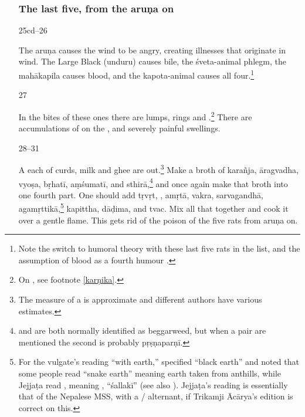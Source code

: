\begin{translation}
\begin{itemize}
\subsubsection{The last five, from the \Gls{aruṇa} on}
\item[25cd--26]

The \Gls{aruṇa} causes the wind to be angry, creating illnesses that
originate in wind. The Large Black (\gls{unduru}) causes bile, the
\Gls{śveta-animal} phlegm, the \Gls{mahākapila} causes blood, and the
\Gls{kapota-animal} causes all four.\footnote{Note the switch to humoral
    theory with these last five rats in the list, and the assumption of blood as a 
    fourth humour .}

\item[27]

In the bites of these ones there are lumps, rings and
.\footnote{On , see footnote
    \ref{karṇika}.}  There are accumulations of  on the 
    , and severely painful swellings.

\item[28--31]    
    
A  each of curds, milk and ghee are
 out.\footnote{The measure of a  is
    approximate and different authors have various estimates.} Make a
    broth of \gls{karañja}, \gls{āragvadha}, \gls{vyoṣa}, \gls{bṛhatī},
    \gls{aṃśumatī}, and \gls{sthirā},\footnote{ and
         are both normally identified as beggarweed, but when a
        pair are mentioned the second is probably \gls{pṛṣṇaparṇī}.} and once
    again make that broth into one fourth part. %
    One should add    \gls{tṛvṛt}, , \gls{amṛtā},
    \gls{vakra}, \gls{sarvagandhā}, \gls{agamṛttikā},\footnote{For the
        vulgate's reading  “with earth,” 
        specified “black earth” and noted that some people read
         “snake earth” meaning earth taken from anthills,
        while Jejjaṭa read , meaning ,
        “\gls{śallakī}”  (see also \cite[392]{gvdb}). Jejjaṭa's reading is
        essentially that of the Nepalese MSS, with a /
        alternant, if Trikamji Ācārya's edition is correct on this.} %
        \gls{kapittha}, \gls{dāḍima}, and \gls{tvac}. Mix all that together
        and cook it over a gentle flame.
This gets rid of the poison of the five rats from \Gls{aruṇa} on.


\end{itemize}
\end{translation}

